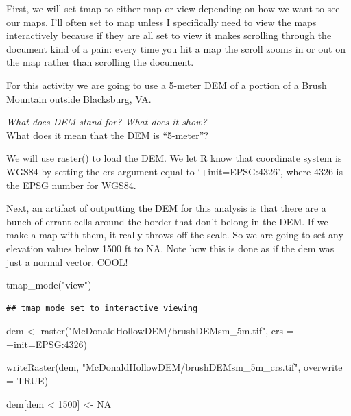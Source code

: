 \documentclass[
]{book}
\newenvironment{Shaded}{\begin{snugshade}}{\end{snugshade}}
\newcommand{\AttributeTok}[1]{\textcolor[rgb]{0.77,0.63,0.00}{#1}}
\newcommand{\ConstantTok}[1]{\textcolor[rgb]{0.00,0.00,0.00}{#1}}
\newcommand{\DecValTok}[1]{\textcolor[rgb]{0.00,0.00,0.81}{#1}}
\newcommand{\FunctionTok}[1]{\textcolor[rgb]{0.00,0.00,0.00}{#1}}
\newcommand{\NormalTok}[1]{#1}
\newcommand{\OtherTok}[1]{\textcolor[rgb]{0.56,0.35,0.01}{#1}}
\newcommand{\SpecialCharTok}[1]{\textcolor[rgb]{0.00,0.00,0.00}{#1}}
\newcommand{\StringTok}[1]{\textcolor[rgb]{0.31,0.60,0.02}{#1}}
\begin{document}
First, we will set tmap to either map or view depending on how we want to see our maps. I'll often set to map unless I specifically need to view the maps interactively because if they are all set to view it makes scrolling through the document kind of a pain: every time you hit a map the scroll zooms in or out on the map rather than scrolling the document.

For this activity we are going to use a 5-meter DEM of a portion of a Brush Mountain outside Blacksburg, VA.

\emph{What does DEM stand for? What does it show?\\
}What does it mean that the DEM is ``5-meter''?

We will use raster() to load the DEM. We let R know that coordinate system is WGS84 by setting the crs argument equal to `+init=EPSG:4326', where 4326 is the EPSG number for WGS84.

Next, an artifact of outputting the DEM for this analysis is that there are a bunch of errant cells around the border that don't belong in the DEM. If we make a map with them, it really throws off the scale. So we are going to set any elevation values below 1500 ft to NA. Note how this is done as if the dem was just a normal vector. COOL!

\begin{Shaded}
\begin{Highlighting}[]
\FunctionTok{tmap\_mode}\NormalTok{(}\StringTok{"view"}\NormalTok{)}
\end{Highlighting}
\end{Shaded}

\begin{verbatim}
## tmap mode set to interactive viewing
\end{verbatim}

\begin{Shaded}
\begin{Highlighting}[]
\NormalTok{dem }\OtherTok{\textless{}{-}} \FunctionTok{raster}\NormalTok{(}\StringTok{"McDonaldHollowDEM/brushDEMsm\_5m.tif"}\NormalTok{, }\AttributeTok{crs =} \StringTok{\textquotesingle{}+init=EPSG:4326\textquotesingle{}}\NormalTok{)}

\FunctionTok{writeRaster}\NormalTok{(dem, }\StringTok{"McDonaldHollowDEM/brushDEMsm\_5m\_crs.tif"}\NormalTok{, }\AttributeTok{overwrite =} \ConstantTok{TRUE}\NormalTok{) }

\NormalTok{dem[dem }\SpecialCharTok{\textless{}} \DecValTok{1500}\NormalTok{] }\OtherTok{\textless{}{-}} \ConstantTok{NA}
\end{Highlighting}
\end{Shaded}
\end{document}
